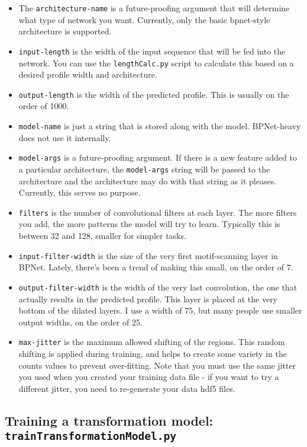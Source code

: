 \documentclass{article}
\begin{document}
\begin{itemize}
    \item The \texttt{architecture-name} is a future-proofing argument that will determine what type of network you want. Currently, only the basic bpnet-style architecture is supported. 
    \item \texttt{input-length} is the width of the input sequence that will be fed into the network. You can use the \texttt{lengthCalc.py} script to calculate this based on a desired profile width and architecture.
    \item \texttt{output-length} is the width of the predicted profile. This is usually on the order of 1000.
    \item \texttt{model-name} is just a string that is stored along with the model. BPNet-heavy does not use it internally.
    \item \texttt{model-args} is a future-proofing argument. If there is a new feature added to a particular architecture, the \texttt{model-args} string will be passed to the architecture and the architecture may do with that string as it pleases. Currently, this serves no purpose. 
    \item \texttt{filters} is the number of convolutional filters at each layer. The more filters you add, the more patterns the model will try to learn. Typically this is between 32 and 128, smaller for simpler tasks. 
    \item \texttt{input-filter-width} is the size of the very first motif-scanning layer in BPNet. Lately, there's been a trend of making this small, on the order of 7. 
    \item \texttt{output-filter-width} is the width of the very last convolution, the one that actually results in the predicted profile. This layer is placed at the very bottom of the dilated layers. I use a width of 75, but many people use smaller output widths, on the order of 25. 
    \item \texttt{max-jitter} is the maximum allowed shifting of the regions. This random shifting is applied during training, and helps to create some variety in the counts values to prevent over-fitting. Note that you must use the same jitter you used when you created your training data file - if you want to try a different jitter, you need to re-generate your data hdf5 files. 
\end{itemize}

\newpage

\subsection{Training a transformation model: \texttt{trainTransformationModel.py}}
\end{document}
